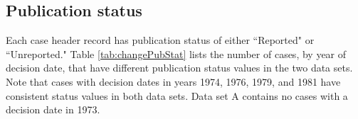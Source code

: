 \documentclass[10pt, letterpaper]{article}
\begin{document}
\begin{spacing}{1.0}

\clearpage

\section{Publication status}

Each case header record has publication status of either ``Reported" or ``Unreported."  Table \ref{tab:changePubStat} lists the number of cases, by year of decision date, that have different publication status values in the two data sets.  Note that cases with decision dates in years 1974, 1976, 1979, and 1981 have consistent status values in both data sets.  Data set A contains no cases with a decision date in 1973.\\[-6pt]

\vspace{0.25in}


\end{spacing}
\end{document}
